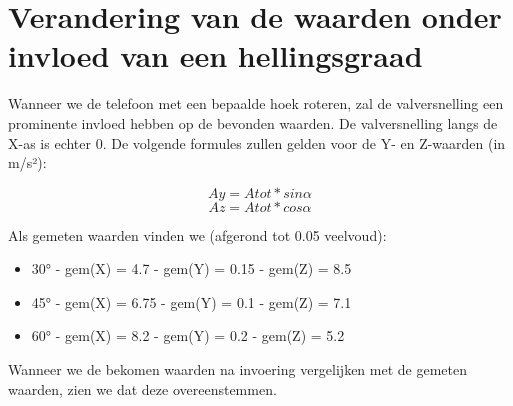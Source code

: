 \documentclass{article}
\begin{document}
\section{Verandering van de waarden onder invloed van een hellingsgraad}
\begin{minipage}{.65\textwidth}
  Wanneer we de telefoon met een bepaalde hoek roteren, zal de valversnelling een prominente invloed hebben op de bevonden waarden. De valversnelling langs de X-as is echter 0. De volgende formules zullen gelden voor de Y- en Z-waarden (in m/s²): 

    \[Ay = Atot*sin \alpha\]
    \[Az= Atot*cos \alpha\]

    Als gemeten waarden vinden we (afgerond tot 0.05 veelvoud):
    \begin{itemize}
        \item 30° - gem(X) = 4.7 - gem(Y) = 0.15 - gem(Z) = 8.5
        \item 45° - gem(X) = 6.75 - gem(Y) = 0.1 - gem(Z) = 7.1
        \item 60° - gem(X) = 8.2 - gem(Y) = 0.2 - gem(Z) = 5.2
    \end{itemize}
    Wanneer we de bekomen waarden na invoering vergelijken met de gemeten waarden, zien we dat deze overeenstemmen.
\end{minipage}%
\end{document}
